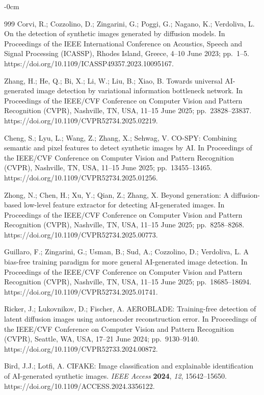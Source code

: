 \documentclass[applsci,article,submit,pdftex,moreauthors]{Definitions/mdpi}
\begin{document}
\begin{adjustwidth}{-\extralength}{0cm}
{\begin{thebibliography}{999}
Corvi, R.; Cozzolino, D.; Zingarini, G.; Poggi, G.; Nagano, K.; Verdoliva, L. On the detection of synthetic images generated by diffusion models. In Proceedings of the IEEE International Conference on Acoustics, Speech and Signal Processing (ICASSP), Rhodes Island, Greece, 4--10 June 2023; pp.~1--5. https://doi.org/10.1109/ICASSP49357.2023.10095167.

Zhang, H.; He, Q.; Bi, X.; Li, W.; Liu, B.; Xiao, B. Towards universal AI-generated image detection by variational information bottleneck network. In Proceedings of the IEEE/CVF Conference on Computer Vision and Pattern Recognition (CVPR), Nashville, TN, USA, 11--15 June 2025; pp.~23828--23837. https://doi.org/10.1109/CVPR52734.2025.02219.

Cheng, S.; Lyu, L.; Wang, Z.; Zhang, X.; Sehwag, V. CO-SPY: Combining semantic and pixel features to detect synthetic images by AI. In Proceedings of the IEEE/CVF Conference on Computer Vision and Pattern Recognition (CVPR), Nashville, TN, USA, 11--15 June 2025; pp.~13455--13465. https://doi.org/10.1109/CVPR52734.2025.01256.

Zhong, N.; Chen, H.; Xu, Y.; Qian, Z.; Zhang, X. Beyond generation: A diffusion-based low-level feature extractor for detecting AI-generated images. In Proceedings of the IEEE/CVF Conference on Computer Vision and Pattern Recognition (CVPR), Nashville, TN, USA, 11--15 June 2025; pp.~8258--8268. https://doi.org/10.1109/CVPR52734.2025.00773.

Guillaro, F.; Zingarini, G.; Usman, B.; Sud, A.; Cozzolino, D.; Verdoliva, L. A bias-free training paradigm for more general AI-generated image detection. In Proceedings of the IEEE/CVF Conference on Computer Vision and Pattern Recognition (CVPR), Nashville, TN, USA, 11--15 June 2025; pp.~18685--18694. https://doi.org/10.1109/CVPR52734.2025.01741.

Ricker, J.; Lukovnikov, D.; Fischer, A. AEROBLADE: Training-free detection of latent diffusion images using autoencoder reconstruction error. In Proceedings of the IEEE/CVF Conference on Computer Vision and Pattern Recognition (CVPR), Seattle, WA, USA, 17--21 June 2024; pp.~9130--9140. https://doi.org/10.1109/CVPR52733.2024.00872.

Bird, J.J.; Lotfi, A. CIFAKE: Image classification and explainable identification of AI-generated synthetic images. {\em IEEE Access} {\bf 2024}, {\em 12}, 15642--15650. https://doi.org/10.1109/ACCESS.2024.3356122.


\end{thebibliography}}
\end{adjustwidth}
\end{document}
